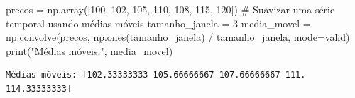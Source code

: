 \documentclass[
  portuguese,
  letterpaper,
  DIV=11,
  numbers=noendperiod]{scrreprt}
\newenvironment{Shaded}{\begin{snugshade}}{\end{snugshade}}
\newcommand{\BuiltInTok}[1]{\textcolor[rgb]{0.00,0.23,0.31}{#1}}
\newcommand{\CommentTok}[1]{\textcolor[rgb]{0.37,0.37,0.37}{#1}}
\newcommand{\DecValTok}[1]{\textcolor[rgb]{0.68,0.00,0.00}{#1}}
\newcommand{\NormalTok}[1]{\textcolor[rgb]{0.00,0.23,0.31}{#1}}
\newcommand{\OperatorTok}[1]{\textcolor[rgb]{0.37,0.37,0.37}{#1}}
\newcommand{\StringTok}[1]{\textcolor[rgb]{0.13,0.47,0.30}{#1}}
\theoremstyle{definition}
\theoremstyle{remark}
\begin{document}
\begin{Shaded}
\begin{Highlighting}[]
\NormalTok{precos }\OperatorTok{=}\NormalTok{ np.array([}\DecValTok{100}\NormalTok{, }\DecValTok{102}\NormalTok{, }\DecValTok{105}\NormalTok{, }\DecValTok{110}\NormalTok{, }\DecValTok{108}\NormalTok{, }\DecValTok{115}\NormalTok{, }\DecValTok{120}\NormalTok{])}
\CommentTok{\# Suavizar uma série temporal usando médias móveis}
\NormalTok{tamanho\_janela }\OperatorTok{=} \DecValTok{3}
\NormalTok{media\_movel }\OperatorTok{=}\NormalTok{ np.convolve(precos, np.ones(tamanho\_janela) }\OperatorTok{/}\NormalTok{ tamanho\_janela, mode}\OperatorTok{=}\StringTok{\textquotesingle{}valid\textquotesingle{}}\NormalTok{)}
\BuiltInTok{print}\NormalTok{(}\StringTok{"Médias móveis:"}\NormalTok{, media\_movel)}
\end{Highlighting}
\end{Shaded}

\begin{verbatim}
Médias móveis: [102.33333333 105.66666667 107.66666667 111.         114.33333333]
\end{verbatim}
\end{document}
